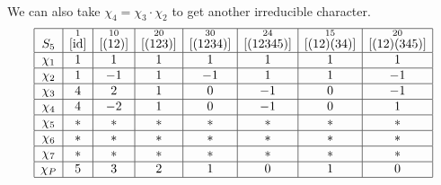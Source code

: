 \begin{exmp}{}
\begin{align*}
\begin{array}{|c|c|c|c|c|c|c|c|}
        \end{array} 
    \end{align*}
    We can also take $\chi_4 = \chi_3 \cdot \chi_2$ to get another irreducible 
    character. 
    \begin{align*}
        \begin{array}{|c|c|c|c|c|c|c|c|}
            \hline
            S_5    & \overset{1}{[\id]} & \overset{10}{[(12)]} & \overset{20}{[(123)]} & \overset{30}{[(1234)]} & \overset{24}{[(12345)]} & \overset{15}{[(12)(34)]} & \overset{20}{[(12)(345)]} \\ \hline
            \chi_1 & 1                  & 1                    & 1                     & 1                      & 1                       & 1                        & 1                         \\ \hline
            \chi_2 & 1                  & -1                   & 1                     & -1                     & 1                       & 1                        & -1                        \\ \hline
            \chi_3 & 4                  & 2                    & 1                     & 0                      & -1                      & 0                        & -1                        \\ \hline
            \chi_4 & 4                  & -2                   & 1                     & 0                      & -1                      & 0                        & 1                         \\ \hline
            \chi_5 & *                  & *                    & *                     & *                      & *                       & *                        & *                         \\ \hline
            \chi_6 & *                  & *                    & *                     & *                      & *                       & *                        & *                         \\ \hline
            \chi_7 & *                  & *                    & *                     & *                      & *                       & *                        & *                         \\ \hline
            \chi_P & 5                  & 3                    & 2                     & 1                      & 0                       & 1                        & 0                         \\ \hline 
        \end{array} 

\end{align*}
\end{exmp}
